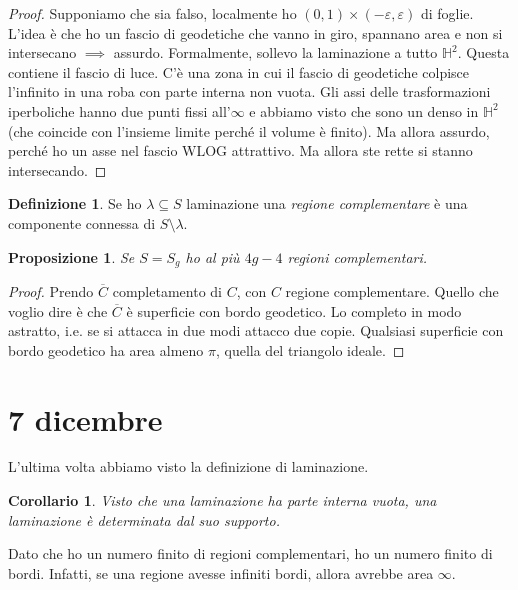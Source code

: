 \documentclass[a4paper]{article}
\newtheorem{proposition}{Proposizione}
\newtheorem{corollary}{Corollario}
\theoremstyle{definition}
\newtheorem{definition}{Definizione}
\begin{document}
    \begin{proof}
        Supponiamo che sia falso, localmente ho $(0,1) \times (-\varepsilon,\varepsilon)$ di foglie. L'idea è che ho un fascio di geodetiche che vanno in giro, spannano area e non si intersecano $\implies$ assurdo.
        Formalmente, sollevo la laminazione a tutto $\mathbb H^2$. Questa contiene il fascio di luce. C'è una zona in cui il fascio di geodetiche colpisce l'infinito in una roba con parte interna non vuota. Gli assi delle trasformazioni iperboliche hanno due punti fissi all'$\infty$ e abbiamo visto che sono un denso in $\mathbb H^2$ (che coincide con l'insieme limite perché il volume è finito). Ma allora assurdo, perché ho un asse nel fascio WLOG attrattivo. Ma allora ste rette si stanno intersecando.
    \end{proof}

    \begin{definition}
        Se ho $\lambda \subseteq S$ laminazione una \emph{regione complementare} è una componente connessa di $S \setminus \lambda$.
    \end{definition}

    \begin{proposition}
        Se $S = S_g$ ho al più $4g - 4$ regioni complementari.
    \end{proposition}

    \begin{proof}
        Prendo $\overline{C}$ completamento di $C$, con $C$ regione complementare. Quello che voglio dire è che $\overline{C}$ è superficie con bordo geodetico. Lo completo in modo astratto, i.e. se si attacca in due modi attacco due copie. Qualsiasi superficie con bordo geodetico ha area almeno $\pi$, quella del triangolo ideale.
    \end{proof}

\section{7 dicembre}

    L'ultima volta abbiamo visto la definizione di laminazione.

    \begin{corollary}
        Visto che una laminazione ha parte interna vuota, una laminazione è determinata dal suo supporto.
    \end{corollary}

    Dato che ho un numero finito di regioni complementari, ho un numero finito di bordi. Infatti, se una regione avesse infiniti bordi, allora avrebbe area $\infty$.
\end{document}

